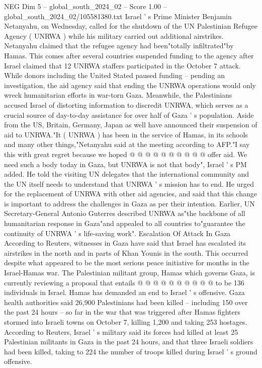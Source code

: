 \begin{textsample}{NEG Dim 5 – global\_south\_2024\_02 – Score 1.00 – global\_south\_2024\_02/105581380.txt}  \label{ex:f5_neg_257}
Israel ' s Prime Minister Benjamin Netanyahu, on Wednesday, called for the shutdown of the UN Palestinian Refugee Agency ( UNRWA ) while his military carried out additional airstrikes.
Netanyahu claimed that the refugee agency had been"totally infiltrated"by Hamas.
This comes after several countries suspended funding to the agency after Israel claimed that 12 UNRWA staffers participated in the October 7 attack.
While donors including the United Stated paused funding -- pending an investigation, the aid agency said that ending the UNRWA operations would only wreck humanitarian efforts in war-torn Gaza.
Meanwhile, the Palestinians accused Israel of distorting information to discredit UNRWA, which serves as a crucial source of day-to-day assistance for over half of Gaza ' s population.
Aside from the US, Britain, Germany, Japan as well have announced their suspension of aid to UNRWA."It ( UNRWA ) has been in the service of Hamas, in its schools and many other things,"Netanyahu said at the meeting according to AFP."I say this with great regret because we hoped @ @ @ @ @ @ @ @ @ @ offer aid.
We need such a body today in Gaza, but UNRWA is not that body", Israel ' s PM added.
He told the visiting UN delegates that the international community and the UN itself needs to understand that UNRWA ' s mission has to end.
He urged for the replacement of UNRWA with other aid agencies, and said that this change is important to address the challenges in Gaza as per their intention.
Earlier, UN Secretary-General Antonio Guterres described UNRWA as"the backbone of all humanitarian response in Gaza"and appealed to all countries to"guarantee the continuity of UNRWA ' s life-saving work".
Escalation Of Attack In Gaza According to Reuters, witnesses in Gaza have said that Israel has escalated its airstrikes in the north and in parts of Khan Younis in the south.
This occurred despite what appeared to be the most serious peace initiative for months in the Israel-Hamas war.
The Palestinian militant group, Hamas which governs Gaza, is currently reviewing a proposal that entails @ @ @ @ @ @ @ @ @ @ to be 136 individuals in Israel.
Hamas has demanded an end to Israel ' s offensive.
Gaza health authorities said 26,900 Palestinians had been killed -- including 150 over the past 24 hours -- so far in the war that was triggered after Hamas fighters stormed into Israeli towns on October 7, killing 1,200 and taking 253 hostages.
According to Reuters, Israel ' s military said its forces had killed at least 25 Palestinian militants in Gaza in the past 24 hours, and that three Israeli soldiers had been killed, taking to 224 the number of troops killed during Israel ' s ground offensive.

\end{textsample}
